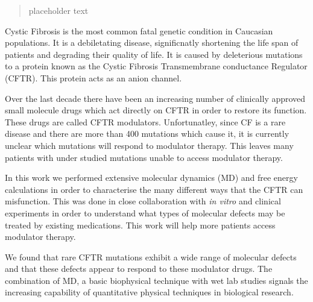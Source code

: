 \begin{abstract}
\setcounter{page}{3}
\thispagestyle{plain}

placeholder text

\end{abstract}
Cystic Fibrosis is the most common fatal genetic condition in Caucasian populations. It is a debiletating disease, significnatly shortening the life span of patients and degrading their quality of life. It is caused by deleterious mutations to a protein known as the Cystic Fibrosis Transmembrane conductance Regulator (CFTR). This protein acts as an anion channel.

Over the last decade there have been an increasing number of clinically approved small molecule drugs which act directly on CFTR in order to restore its function. These drugs are called CFTR modulators. Unfortunatley, since CF is a rare disease and there are more than 400 mutations which cause it, it is currently unclear which mutations will respond to modulator therapy. This leaves many patients with under studied mutations unable to access modulator therapy.

In this work we performed extensive molecular dynamics (MD) and free energy calculations in order to characterise the many different ways that the CFTR can misfunction. This was done in close collaboration with \textit{in vitro} and clinical experiments in order to understand what types of molecular defects may be treated by existing medications. This work will help more patients access modulator therapy.

We found that rare CFTR mutations exhibit a wide range of molecular defects and that these defects appear to respond to these modulator drugs. The combination of MD, a basic biophysical technique with wet lab studies signals the increasing capability of quantitative physical techniques in biological research.
